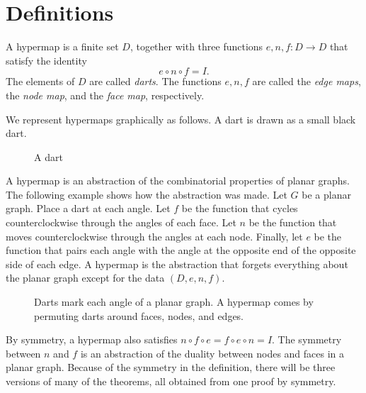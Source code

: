 


\section{Definitions}



\begin{definition}  A hypermap is a finite set $D$, together with
three functions $e,n,f:D\to D$ that satisfy the identity
    $$e\circ n\circ f = I.$$
The elements of $D$ are called {\it darts}.  The functions $e,n,f$
are called the {\it edge maps}, the {\it node map}, and the {\it
face map}, respectively.
\end{definition}



\begin{remark} We represent hypermaps graphically as follows.  A
dart is drawn as a small black dart.
\end{remark}

\begin{figure}[htb]
  \centering
  \caption{A dart}
  \label{fig:dart}
\end{figure}

\begin{remark}\label{rem:hypermap} A hypermap is an abstraction of
the combinatorial properties of planar graphs.  The following
example shows how the abstraction was made.  Let $G$ be a planar
graph.  Place a dart at each angle.    Let $f$ be the function that
cycles counterclockwise through the angles of each face.  Let $n$ be
the function that moves counterclockwise through the angles at each
node.  Finally, let $e$ be the function that pairs each angle with
the angle at the opposite end of the opposite side of each edge.  A
hypermap is the abstraction that forgets everything about the planar
graph except for the data $(D,e,n,f)$.
\end{remark}

\begin{figure}[htb]
  \centering
  \caption{Darts mark each angle of a planar graph. A hypermap comes by
  permuting darts around faces, nodes, and edges.}
  \label{fig:hypermap_ex}
\end{figure}

By symmetry, a hypermap also satisfies $n\circ f\circ e = f\circ
e\circ n = I$.  The symmetry between $n$ and $f$ is an abstraction
of the duality between nodes and faces in a planar graph. Because of
the symmetry in the definition, there will be three versions of many
of the theorems, all obtained from one proof by symmetry.


